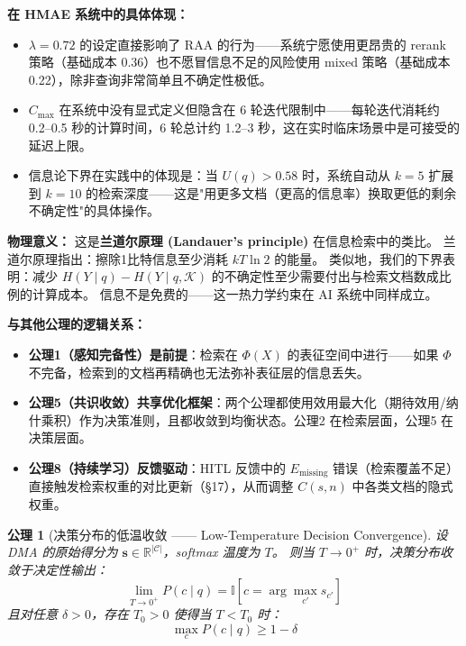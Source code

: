 \documentclass[11pt,a4paper]{ctexart}
\newtheorem{axiom}{公理}[section]
\theoremstyle{remark}
\begin{document}
\textbf{在 HMAE 系统中的具体体现：}
\begin{itemize}[nosep]
\item $\lambda=0.72$ 的设定直接影响了 RAA 的行为——系统宁愿使用更昂贵的 rerank 策略（基础成本 0.36）也不愿冒信息不足的风险使用 mixed 策略（基础成本 0.22），除非查询非常简单且不确定性极低。
\item $C_{\max}$ 在系统中没有显式定义但隐含在 6 轮迭代限制中——每轮迭代消耗约 0.2--0.5 秒的计算时间，6 轮总计约 1.2--3 秒，这在实时临床场景中是可接受的延迟上限。
\item 信息论下界在实践中的体现是：当 $U(q) > 0.58$ 时，系统自动从 $k=5$ 扩展到 $k=10$ 的检索深度——这是"用更多文档（更高的信息率）换取更低的剩余不确定性"的具体操作。
\end{itemize}

\textbf{物理意义：} 这是\textbf{兰道尔原理 (Landauer's principle)} 在信息检索中的类比。
兰道尔原理指出：擦除1比特信息至少消耗 $kT\ln 2$ 的能量。
类似地，我们的下界表明：减少 $H(Y \mid q) - H(Y \mid q, \mathcal{K})$
的不确定性至少需要付出与检索文档数成比例的计算成本。
信息不是免费的——这一热力学约束在 AI 系统中同样成立。

\textbf{与其他公理的逻辑关系：}
\begin{itemize}[nosep]
\item \textbf{公理1（感知完备性）是前提}：检索在 $\Phi(X)$ 的表征空间中进行——如果 $\Phi$ 不完备，检索到的文档再精确也无法弥补表征层的信息丢失。
\item \textbf{公理5（共识收敛）共享优化框架}：两个公理都使用效用最大化（期待效用/纳什乘积）作为决策准则，且都收敛到均衡状态。公理2 在检索层面，公理5 在决策层面。
\item \textbf{公理8（持续学习）反馈驱动}：HITL 反馈中的 $E_{\text{missing}}$ 错误（检索覆盖不足）直接触发检索权重的对比更新（§17），从而调整 $C(s,n)$ 中各类文档的隐式权重。
\end{itemize}

\begin{axiom}[决策分布的低温收敛 —— Low-Temperature Decision Convergence]
\label{ax:decision}
设 DMA 的原始得分为 $\mathbf{s} \in \mathbb{R}^{|\mathcal{C}|}$，softmax 温度为 $T$。
则当 $T \to 0^+$ 时，决策分布收敛于决定性输出：
\begin{equation}
\lim_{T \to 0^+} P(c \mid q) = \mathbb{I}[c = \arg\max_{c'} s_{c'}]
\end{equation}
且对任意 $\delta > 0$，存在 $T_0 > 0$ 使得当 $T < T_0$ 时：
\begin{equation}
\max_c P(c \mid q) \geq 1 - \delta
\end{equation}
\end{axiom}
\end{document}
